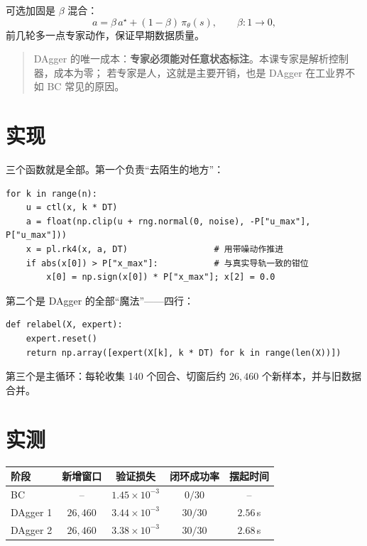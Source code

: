 可选加固是 $\beta$ 混合：
\begin{equation}
  a=\beta\,a^\star+(1-\beta)\,\pi_\theta(s),\qquad \beta:1\to0,
\end{equation}
前几轮多一点专家动作，保证早期数据质量。

\begin{quote}
DAgger 的唯一成本：\textbf{专家必须能对任意状态标注}。本课专家是解析控制器，成本为零；
若专家是人，这就是主要开销，也是 DAgger 在工业界不如 BC 常见的原因。
\end{quote}

\section{实现}

三个函数就是全部。第一个负责“去陌生的地方”：

\begin{lstlisting}[caption={rollout\_policy：带探索噪声的闭环}]
for k in range(n):
    u = ctl(x, k * DT)
    a = float(np.clip(u + rng.normal(0, noise), -P["u_max"], P["u_max"]))
    x = pl.rk4(x, a, DT)                 # 用带噪动作推进
    if abs(x[0]) > P["x_max"]:           # 与真实导轨一致的钳位
        x[0] = np.sign(x[0]) * P["x_max"]; x[2] = 0.0
\end{lstlisting}

第二个是 DAgger 的全部“魔法”——四行：

\begin{lstlisting}[caption={relabel：专家在策略的状态上标注}]
def relabel(X, expert):
    expert.reset()
    return np.array([expert(X[k], k * DT) for k in range(len(X))])
\end{lstlisting}

第三个是主循环：每轮收集 140 个回合、切窗后约 $26{,}460$ 个新样本，并与旧数据合并。

\section{实测}

\begin{center}\small
\begin{tabular}{@{}lcccc@{}}
\toprule
阶段 & 新增窗口 & 验证损失 & 闭环成功率 & 摆起时间 \\
\midrule
BC & -- & $1.45\times10^{-3}$ & $0/30$ & -- \\
DAgger 1 & $26{,}460$ & $3.44\times10^{-3}$ & $30/30$ & $2.56$\,s \\
DAgger 2 & $26{,}460$ & $3.38\times10^{-3}$ & $30/30$ & $2.68$\,s \\
\bottomrule
\end{tabular}
\end{center}

